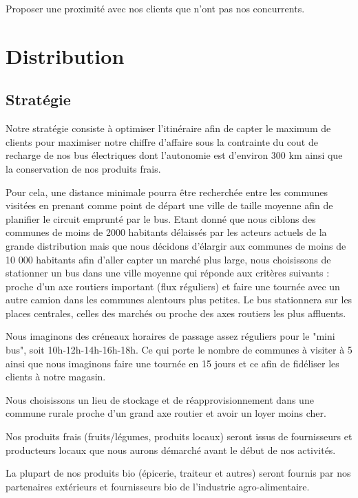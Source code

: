 \documentclass[12pt,a4paper]{report}
\begin{document}
		Proposer une proximité avec nos clients que n'ont pas nos concurrents. 
		
			
		
		
		\chapter{Distribution}
		
			\section{Stratégie}
				
			Notre stratégie consiste à optimiser l’itinéraire afin de capter le maximum de clients pour maximiser notre chiffre d’affaire sous la contrainte du cout de recharge de nos bus électriques dont l’autonomie est d’environ 300 km ainsi que la conservation de nos produits frais. 
			
			Pour cela, une distance minimale pourra être recherchée entre les communes visitées en prenant comme point de départ une ville de taille moyenne  afin de planifier le circuit emprunté par le bus. Etant donné que nous ciblons des communes de moins de 2000 habitants délaissés par les acteurs actuels de la grande distribution mais que nous décidons d'élargir aux communes de moins de 10 000 habitants afin d'aller capter un marché plus large, nous choisissons de stationner un bus dans une ville moyenne qui réponde aux critères suivants : proche d’un axe routiers important (flux réguliers) et faire une tournée avec un autre camion dans les communes alentours plus petites. 
			Le bus stationnera sur les places centrales, celles des marchés ou proche des axes routiers les plus affluents. 
			
			Nous imaginons des créneaux horaires de passage assez réguliers pour le "mini bus", soit 10h-12h-14h-16h-18h. Ce qui porte le nombre de communes à visiter à 5 ainsi que nous imaginons faire une tournée en 15 jours et ce afin de fidéliser les clients à notre magasin.
			
			Nous choisissons un lieu de stockage et de réapprovisionnement dans une commune rurale proche d'un grand axe routier et avoir un loyer moins cher.

		 	Nos produits frais (fruits/légumes, produits locaux) seront issus de fournisseurs et producteurs locaux que nous aurons démarché avant le début de nos activités. 
		 	
		 	La plupart de nos produits bio (épicerie, traiteur et autres) seront fournis par nos partenaires extérieurs et fournisseurs bio de l'industrie agro-alimentaire.
		 
\end{document}
